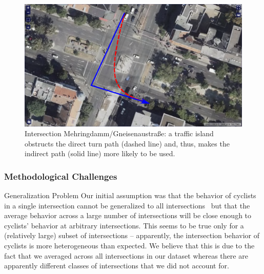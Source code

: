 \begin{figure}
\includegraphics[width=\columnwidth]{fig/mehringdamm_island_arrows.png}
\caption{Intersection Mehringdamm/Gneisenaustraße: a traffic island obstructs the direct turn path (dashed line) and, thus, makes the indirect path (solid line) more likely to be used.}
\label{fig:mehringdamm_traffic_island}
\end{figure}

\subsubsection{Methodological Challenges}
\label{subsubsec:methodological_challenges_sumo}
Generalization Problem
Our initial assumption was that the behavior of cyclists in a single intersection cannot be generalized to all intersections~\cite{kaths2016integration} but that the average behavior across a large number of intersections will be close enough to cyclists' behavior at arbitrary intersections.
This seems to be true only for a (relatively large) subset of intersections -- apparently, the intersection behavior of cyclists is more heterogeneous than expected.
We believe that this is due to the fact that we averaged across all intersections in our dataset whereas there are apparently different classes of intersections that we did not account for.

